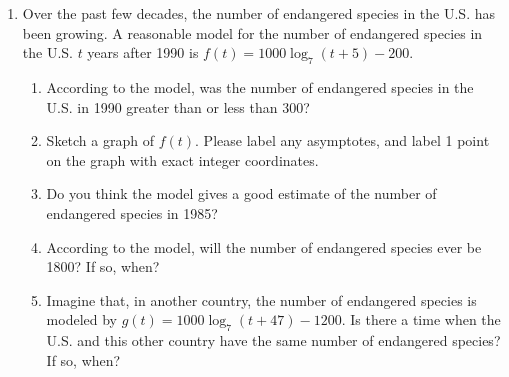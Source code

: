 \documentclass{article}
\theoremstyle{theorem}
\begin{document}
\begin{enumerate}
\begin{enumerate}
  \item
    \begin{problem}[\vfill]
      Anna's substance currently has a mass of 10 g. How quickly is its mass changing with respect to time (right now)? Please give an instantaneous rate of change, and include units. 
    \end{problem}

  \item
    \begin{problem}[\nstretch{2}]
      Is there a time when Anna's substance and Beatrice's substance have the same mass? If so, find that time; if not, why not? 
    \end{problem}

  \end{enumerate}

\item %

  Over the past few decades, the number of endangered species in the U.S. has been growing. A reasonable model for the number of endangered species in the U.S. $t$ years after 1990 is $f(t) = 1000 \log_7 (t + 5) - 200$.

  \begin{enumerate}

  \item
    \begin{problem}[\vfill]
      According to the model, was the number of endangered species in the U.S. in 1990 greater than or less than 300? 
    \end{problem}

  \item
    \begin{problem}[\vfill]
      Sketch a graph of $f(t)$. Please label any asymptotes, and label 1 point on the graph with exact integer coordinates. 
    \end{problem}

  \item
    \begin{problem}[\nstretch{0.25}]
      Do you think the model gives a good estimate of the number of endangered species in 1985? 
    \end{problem}

  \item
    \begin{problem}[\vfill]
      According to the model, will the number of endangered species ever be 1800? If so, when? 
    \end{problem}

  \item
    \begin{problem}[\vfill\newpage]
      Imagine that, in another country, the number of endangered species is modeled by $g(t) = 1000 \log_7 (t + 47) - 1200$. Is there a time when the U.S. and this other country have the same number of endangered species? If so, when?
    \end{problem}

  \end{enumerate}

\end{enumerate}
\end{document}
